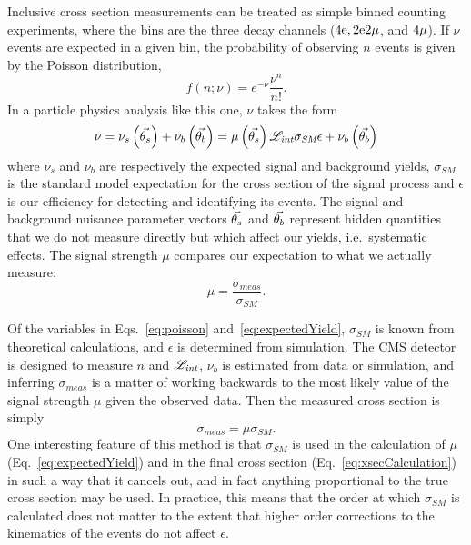 Inclusive cross section measurements can be treated as simple binned counting experiments, where the bins are the three decay channels ($4\mathrm{e}, 2\mathrm{e}2\mathrm{\mu}$, and $4\mathrm{\mu}$).
If $\nu$ events are expected in a given bin, the probability of observing $n$ events is given by the Poisson distribution,
\begin{equation}\label{eq:poisson}
  f\left(n; \nu\right) = e^{-\nu}\frac{\nu^{n}}{n!}.
\end{equation}
In a particle physics analysis like this one, $\nu$ takes the form
\begin{equation}\label{eq:expectedYield}
  \nu = \nu_s\left(\vec{\theta_s}\right) + \nu_b\left(\vec{\theta_b}\right) = \mu\left(\vec{\theta_s}\right) \mathscr{L}_\textit{int} \sigma_\textit{SM} \epsilon + \nu_b\left(\vec{\theta_b}\right)
\end{equation}
where $\nu_s$ and $\nu_b$ are respectively the expected signal and background yields, $\sigma_\textit{SM}$ is the standard model expectation for the cross section of the signal process and $\epsilon$ is our efficiency for detecting and identifying its events.
The signal and background nuisance parameter vectors $\vec{\theta_s}$ and $\vec{\theta_b}$ represent hidden quantities that we do not measure directly but which affect our yields, i.e.\ systematic effects.
The signal strength $\mu$ compares our expectation to what we actually measure:
\begin{equation}\label{eq:signalStrength}
  \mu = \frac{\sigma_\textit{meas}}{\sigma_\textit{SM}}.
\end{equation}

Of the variables in Eqs.~\ref{eq:poisson} and~\ref{eq:expectedYield},  $\sigma_\textit{SM}$ is known from theoretical calculations, and $\epsilon$ is determined from simulation.
The CMS detector is designed to measure $n$ and $\mathscr{L}_\textit{int}$, $\nu_b$ is estimated from data or simulation, and inferring $\sigma_\textit{meas}$ is a matter of working backwards to the most likely value of the signal strength $\mu$ given the observed data.
Then the measured cross section is simply
\begin{equation}\label{eq:xsecCalculation}
  \sigma_\textit{meas} = \mu\sigma_\textit{SM}.
\end{equation}
One interesting feature of this method is that $\sigma_\textit{SM}$ is used in the calculation of $\mu$ (Eq.~\ref{eq:expectedYield}) and in the final cross section (Eq.~\ref{eq:xsecCalculation}) in such a way that it cancels out, and in fact anything proportional to the true cross section may be used.
In practice, this means that the order at which $\sigma_\textit{SM}$ is calculated does not matter to the extent that higher order corrections to the kinematics of the events do not affect $\epsilon$.


